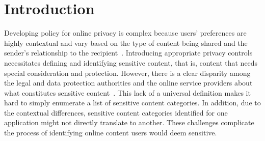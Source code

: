 \documentclass[conference]{IEEEtran}
\begin{document}
\IEEEpeerreviewmaketitle

\section{Introduction}
\label{sec:introduction}

Developing policy for online privacy is complex because users' preferences are highly contextual and vary based on the type of content being shared and the sender's relationship to the recipient~\cite{nissenbaum2009privacy}. Introducing appropriate privacy controls necessitates defining and identifying sensitive content, that is, content that needs special consideration and protection. 
However, there is a clear disparity among the legal and data protection authorities and the online service providers about what constitutes sensitive content~\cite{aboutCNIL,microsoftadpolicy,Facebookadguidelines,Googlepersonalinfo}.
This lack of a universal definition makes it hard to simply enumerate a list of sensitive content categories. 
In addition, due to the contextual differences, sensitive content categories identified for one application might not directly translate to another. These challenges complicate the process of identifying online content users would deem sensitive.
\end{document}
